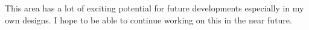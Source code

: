 \documentclass{sigchi}
\begin{document}
This area has a lot of exciting potential for future developments especially in my
own designs. I hope to be able to continue working on this in the near future.




%
%
%
%
%

\balance{}



\end{document}
